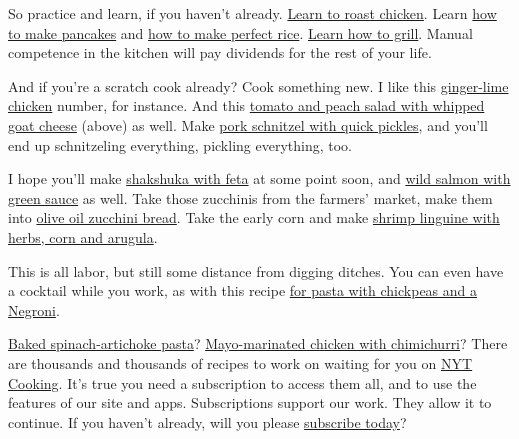 So practice and learn, if you haven't already.
\href{https://cooking.nytimes.com/guides/11-how-to-roast-chicken}{Learn
to roast chicken}. Learn
\href{https://cooking.nytimes.com/guides/24-how-to-make-pancakes}{how to
make pancakes} and
\href{https://cooking.nytimes.com/guides/49-how-to-make-rice}{how to
make perfect rice}.
\href{https://cooking.nytimes.com/guides/7-how-to-grill}{Learn how to
grill}. Manual competence in the kitchen will pay dividends for the rest
of your life.

And if you're a scratch cook already? Cook something new. I like this
\href{https://cooking.nytimes.com/recipes/1021294-ginger-lime-chicken}{ginger-lime
chicken} number, for instance. And this
\href{https://cooking.nytimes.com/recipes/1020367-tomato-and-peach-salad-with-whipped-goat-cheese}{tomato
and peach salad with whipped goat cheese} (above) as well. Make
\href{https://cooking.nytimes.com/recipes/1016866-pork-schnitzel-with-quick-pickles}{pork
schnitzel with quick pickles}, and you'll end up schnitzeling
everything, pickling everything, too.

I hope you'll make
\href{https://cooking.nytimes.com/recipes/1014721-shakshuka-with-feta}{shakshuka
with feta} at some point soon, and
\href{https://cooking.nytimes.com/recipes/1014868-wild-salmon-with-green-sauce}{wild
salmon with green sauce} as well. Take those zucchinis from the farmers'
market, make them into
\href{https://cooking.nytimes.com/recipes/1017522-olive-oil-zucchini-bread}{olive
oil zucchini bread}. Take the early corn and make
\href{https://cooking.nytimes.com/recipes/1020354-shrimp-linguine-with-herbs-corn-and-arugula}{shrimp
linguine with herbs, corn and arugula}.

This is all labor, but still some distance from digging ditches. You can
even have a cocktail while you work, as with this recipe
\href{https://cooking.nytimes.com/recipes/1020019-pasta-with-chickpeas-and-a-negroni}{for
pasta with chickpeas and a Negroni}.

\href{https://cooking.nytimes.com/recipes/1020080-baked-spinach-artichoke-pasta}{Baked
spinach-artichoke pasta}?
\href{https://cooking.nytimes.com/recipes/1020543-mayo-marinated-chicken-with-chimichurri}{Mayo-marinated
chicken with chimichurri}? There are thousands and thousands of recipes
to work on waiting for you on \href{https://cooking.nytimes.com/}{NYT
Cooking}. It's true you need a subscription to access them all, and to
use the features of our site and apps. Subscriptions support our work.
They allow it to continue. If you haven't already, will you please
\href{https://www.nytimes.com/subscription/cooking.html?campaignId=6XQHR}{subscribe
today}?


